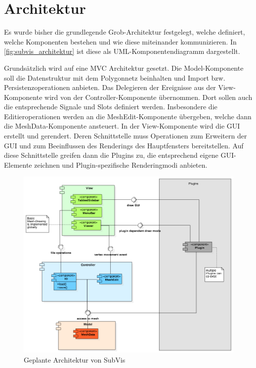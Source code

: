 \section{Architektur}

Es wurde bisher die grundlegende Grob-Architektur festgelegt, welche definiert, welche Komponenten bestehen und wie diese miteinander kommunizieren.
In \autoref{fig:subvis_architektur} ist diese als UML-Komponentendiagramm dargestellt.

Grundsätzlich wird auf eine \ac{MVC} Architektur gesetzt.
Die Model-Komponente soll die Datenstruktur mit dem Polygonnetz beinhalten und Import bzw. Persistenzoperationen anbieten.
Das Delegieren der Ereignisse aus der View-Komponente wird von der Controller-Komponente übernommen. 
Dort sollen auch die entsprechende Signale und Slots definiert werden.
Insbesondere die Editieroperationen werden an die MeshEdit-Komponente übergeben, welche dann die MeshData-Komponente ansteuert.
In der View-Komponente wird die GUI erstellt und gerendert. 
Deren Schnittstelle muss Operationen zum Erweitern der GUI und zum Beeinflussen des Renderings des Hauptfensters bereitstellen.
Auf diese Schnittstelle greifen dann die Plugins zu, die entsprechend eigene GUI-Elemente zeichnen und Plugin-spezifische Renderingmodi anbieten.

\begin{figure}
  \centering
  \includegraphics[width=\textwidth]{content/media/subvis_architektur.png}
  \caption{Geplante Architektur von SubVis}
  \label{fig:subvis_architektur}
\end{figure}


